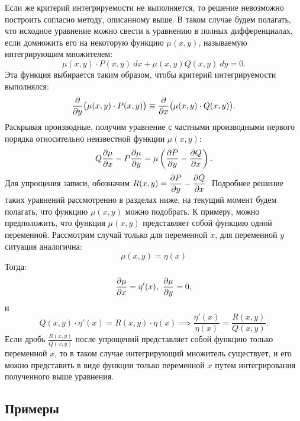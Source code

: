 	Если же критерий интегрируемости не выполняется, то решение невозможно построить согласно методу, описанному выше. В таком случае будем полагать, что исходное уравнение можно свести к уравнению в полных дифференциалах, если домножить его на некоторую функцию $\mu(x, y)$, называемую интегрирующим множителем:
	\[ \mu(x, y) \cdot P(x, y) ~ dx + \mu(x, y) Q(x, y) ~ dy = 0. \]
	Эта функция выбирается таким образом, чтобы критерий интегрируемости выполнялся:
	\[ \dfrac{\partial }{\partial y} \bigl( \mu(x, y) \cdot P(x, y) \bigr) \equiv \dfrac{\partial }{\partial x} \bigl( \mu(x, y) \cdot Q(x, y) \bigr). \]
	Раскрывая производные, получим уравнение с частными производными первого порядка относительно неизвестной функции $ \mu(x, y) $:
	\[ Q\dfrac{\partial \mu}{\partial x} - P\dfrac{\partial \mu}{\partial y} = \mu \left( \dfrac{\partial P}{\partial y} - \dfrac{\partial Q}{\partial x} \right). \]
	Для упрощения записи, обозначим $R(x, y) = \dfrac{\partial P}{\partial y} - \dfrac{\partial Q}{\partial x}$. Подробнее решение таких уравнений рассмотренно в разделах ниже, на текущий момент будем полагать, что функцию $\mu(x, y)$ можно подобрать. К примеру, можно предположить, что функция $\mu(x, y)$ представляет собой функцию одной переменной. Рассмотрим случай только для переменной $x$, для переменной $y$ ситуация аналогична:
	\[ \mu(x, y) = \eta(x) \]
	Тогда:
	\[ \dfrac{\partial \mu}{\partial x} = \eta'(x), ~ \dfrac{\partial \mu}{\partial y} = 0, \]
	и
	\[ Q(x, y) \cdot \eta'(x) = R(x, y) \cdot \eta(x) \implies \frac{\eta'(x)}{\eta(x)} = \frac{R(x, y)}{Q(x, y)}. \]
	Если дробь $\frac{R(x, y)}{Q(x, y)}$ после упрощений представляет собой функцию только переменной $x$, то в таком случае интегрирующий множитель существует, и его можно представить в виде функции только переменной $x$ путем интегрирования полученного выше уравнения.

	\subsection{Примеры}

